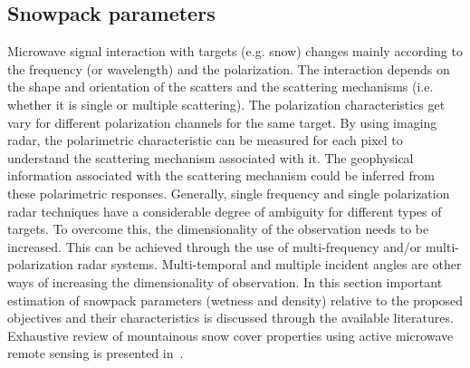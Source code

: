 \subsection{Snowpack parameters}
\label{sec:2.3}
Microwave signal interaction with targets (e.g. snow) changes mainly according to the frequency (or wavelength) and the polarization. The interaction depends on the shape and orientation of the scatters and the scattering mechanisms (i.e. whether it is single or multiple scattering). The polarization characteristics get vary for different polarization channels for the same target. By using imaging radar, the polarimetric characteristic can be measured for each pixel to understand the scattering mechanism associated with it. The geophysical information associated with the scattering mechanism could be inferred from these polarimetric responses. Generally, single frequency and single polarization radar techniques have a considerable degree of ambiguity for different types of targets. To overcome this, the dimensionality of the observation needs to be increased. This can be achieved through the use of multi-frequency and/or multi-polarization radar systems. Multi-temporal and multiple incident angles are other ways of increasing the dimensionality of observation. In this section important estimation of snowpack parameters (wetness and density) relative to the proposed objectives and their characteristics is discussed through the available literatures. Exhaustive review of mountainous snow cover properties using active microwave remote sensing is presented in~\citep{snehmani2015review}.

